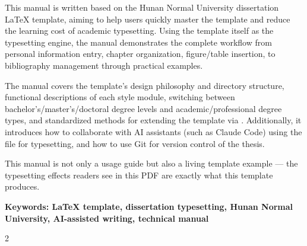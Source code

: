 \documentclass[../main-manual.tex]{subfiles}
\begin{document}
\begin{enabstract}
	{
This manual is written based on the Hunan Normal University dissertation \LaTeX{} template, aiming to help users quickly master the template and reduce the learning cost of academic typesetting. Using the template itself as the typesetting engine, the manual demonstrates the complete workflow from personal information entry, chapter organization, figure/table insertion, to bibliography management through practical examples.

The manual covers the template's design philosophy and directory structure, functional descriptions of each style module, switching between bachelor's/master's/doctoral degree levels and academic/professional degree types, and standardized methods for extending the template via . Additionally, it introduces how to collaborate with AI assistants (such as Claude Code) using the  file for typesetting, and how to use Git for version control of the thesis.

This manual is not only a usage guide but also a living template example — the typesetting effects readers see in this PDF are exactly what this template produces.

		\vspace{0.5cm}
		\par {\bfseries { Keywords: \LaTeX{} template, dissertation typesetting, Hunan Normal University, AI-assisted writing, technical manual}}
	}
\end{enabstract}

\cleardoublepage
\begin{spacing}{2}
	\centering{\tableofcontents}
\end{spacing}
\end{document}
